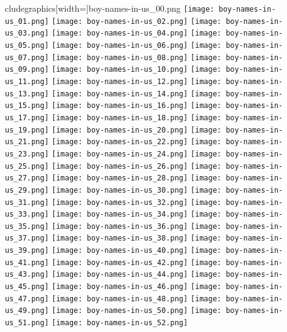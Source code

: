 


cludegraphics[width=\textwidth]{boy-names-in-us_00.png}
  \texttt{[image: boy-names-in-us\_01.png]}
  \texttt{[image: boy-names-in-us\_02.png]}
  \texttt{[image: boy-names-in-us\_03.png]}
  \texttt{[image: boy-names-in-us\_04.png]}
  \texttt{[image: boy-names-in-us\_05.png]}
  \texttt{[image: boy-names-in-us\_06.png]}
  \texttt{[image: boy-names-in-us\_07.png]}
  \texttt{[image: boy-names-in-us\_08.png]}
  \texttt{[image: boy-names-in-us\_09.png]}
  \texttt{[image: boy-names-in-us\_10.png]}
  \texttt{[image: boy-names-in-us\_11.png]}
  \texttt{[image: boy-names-in-us\_12.png]}
  \texttt{[image: boy-names-in-us\_13.png]}
  \texttt{[image: boy-names-in-us\_14.png]}
  \texttt{[image: boy-names-in-us\_15.png]}
  \texttt{[image: boy-names-in-us\_16.png]}
  \texttt{[image: boy-names-in-us\_17.png]}
  \texttt{[image: boy-names-in-us\_18.png]}
  \texttt{[image: boy-names-in-us\_19.png]}
  \texttt{[image: boy-names-in-us\_20.png]}
  \texttt{[image: boy-names-in-us\_21.png]}
  \texttt{[image: boy-names-in-us\_22.png]}
  \texttt{[image: boy-names-in-us\_23.png]}
  \texttt{[image: boy-names-in-us\_24.png]}
  \texttt{[image: boy-names-in-us\_25.png]}
  \texttt{[image: boy-names-in-us\_26.png]}
  \texttt{[image: boy-names-in-us\_27.png]}
  \texttt{[image: boy-names-in-us\_28.png]}
  \texttt{[image: boy-names-in-us\_29.png]}
  \texttt{[image: boy-names-in-us\_30.png]}
  \texttt{[image: boy-names-in-us\_31.png]}
  \texttt{[image: boy-names-in-us\_32.png]}
  \texttt{[image: boy-names-in-us\_33.png]}
  \texttt{[image: boy-names-in-us\_34.png]}
  \texttt{[image: boy-names-in-us\_35.png]}
  \texttt{[image: boy-names-in-us\_36.png]}
  \texttt{[image: boy-names-in-us\_37.png]}
  \texttt{[image: boy-names-in-us\_38.png]}
  \texttt{[image: boy-names-in-us\_39.png]}
  \texttt{[image: boy-names-in-us\_40.png]}
  \texttt{[image: boy-names-in-us\_41.png]}
  \texttt{[image: boy-names-in-us\_42.png]}
  \texttt{[image: boy-names-in-us\_43.png]}
  \texttt{[image: boy-names-in-us\_44.png]}
  \texttt{[image: boy-names-in-us\_45.png]}
  \texttt{[image: boy-names-in-us\_46.png]}
  \texttt{[image: boy-names-in-us\_47.png]}
  \texttt{[image: boy-names-in-us\_48.png]}
  \texttt{[image: boy-names-in-us\_49.png]}
  \texttt{[image: boy-names-in-us\_50.png]}
  \texttt{[image: boy-names-in-us\_51.png]}
  \texttt{[image: boy-names-in-us\_52.png]}

